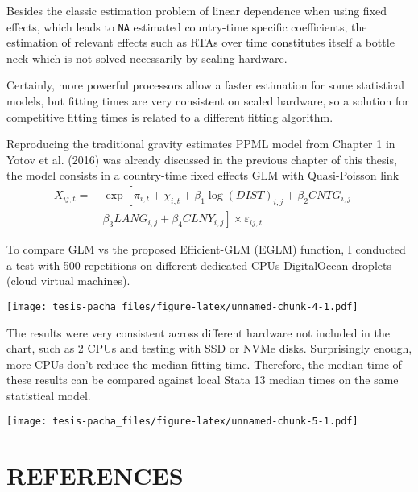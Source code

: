 \documentclass[12pt,reqno,oneside,pdftex]{formato-puc/puctesis} %
\begin{document}
Besides the classic estimation problem of linear dependence when using
fixed effects, which leads to \texttt{NA} estimated country-time
specific coefficients, the estimation of relevant effects such as RTAs
over time constitutes itself a bottle neck which is not solved
necessarily by scaling hardware.

Certainly, more powerful processors allow a faster estimation for some
statistical models, but fitting times are very consistent on scaled
hardware, so a solution for competitive fitting times is related to a
different fitting algorithm.

Reproducing the traditional gravity estimates PPML model from Chapter 1
in Yotov et al. (2016) was already discussed in the previous chapter of
this thesis, the model consists in a country-time fixed effects GLM with
Quasi-Poisson link \begin{align*}
X_{ij,t} =& \:\exp\left[\pi_{i,t} + \chi_{i,t} + \beta_1 \log(DIST)_{i,j} + \beta_2 CNTG_{i,j} +\right.\\
\text{ }& \:\left.\beta_3 LANG_{i,j} + \beta_4 CLNY_{i,j}\right] \times \varepsilon_{ij,t}
\end{align*}

To compare GLM vs the proposed Efficient-GLM (EGLM) function, I
conducted a test with 500 repetitions on different dedicated CPUs
DigitalOcean droplets (cloud virtual machines).

\texttt{[image: tesis-pacha\_files/figure-latex/unnamed-chunk-4-1.pdf]}

The results were very consistent across different hardware not included
in the chart, such as 2 CPUs and testing with SSD or NVMe disks.
Surprisingly enough, more CPUs don't reduce the median fitting time.
Therefore, the median time of these results can be compared against
local Stata 13 median times on the same statistical model.

\texttt{[image: tesis-pacha\_files/figure-latex/unnamed-chunk-5-1.pdf]}

\chapter*{REFERENCES}
\end{document}
